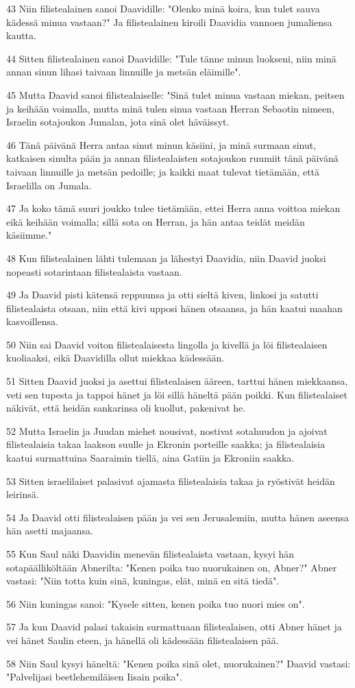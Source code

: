 \par 43 Niin filistealainen sanoi Daavidille: "Olenko minä koira, kun tulet sauva kädessä minua vastaan?" Ja filistealainen kiroili Daavidia vannoen jumaliensa kautta.
\par 44 Sitten filistealainen sanoi Daavidille: "Tule tänne minun luokseni, niin minä annan sinun lihasi taivaan linnuille ja metsän eläimille".
\par 45 Mutta Daavid sanoi filistealaiselle: "Sinä tulet minua vastaan miekan, peitsen ja keihään voimalla, mutta minä tulen sinua vastaan Herran Sebaotin nimeen, Israelin sotajoukon Jumalan, jota sinä olet häväissyt.
\par 46 Tänä päivänä Herra antaa sinut minun käsiini, ja minä surmaan sinut, katkaisen sinulta pään ja annan filistealaisten sotajoukon ruumiit tänä päivänä taivaan linnuille ja metsän pedoille; ja kaikki maat tulevat tietämään, että Israelilla on Jumala.
\par 47 Ja koko tämä suuri joukko tulee tietämään, ettei Herra anna voittoa miekan eikä keihään voimalla; sillä sota on Herran, ja hän antaa teidät meidän käsiimme."
\par 48 Kun filistealainen lähti tulemaan ja lähestyi Daavidia, niin Daavid juoksi nopeasti sotarintaan filistealaista vastaan.
\par 49 Ja Daavid pisti kätensä reppuunsa ja otti sieltä kiven, linkosi ja satutti filistealaista otsaan, niin että kivi upposi hänen otsaansa, ja hän kaatui maahan kasvoillensa.
\par 50 Niin sai Daavid voiton filistealaisesta lingolla ja kivellä ja löi filistealaisen kuoliaaksi, eikä Daavidilla ollut miekkaa kädessään.
\par 51 Sitten Daavid juoksi ja asettui filistealaisen ääreen, tarttui hänen miekkaansa, veti sen tupesta ja tappoi hänet ja löi sillä häneltä pään poikki. Kun filistealaiset näkivät, että heidän sankarinsa oli kuollut, pakenivat he.
\par 52 Mutta Israelin ja Juudan miehet nousivat, nostivat sotahuudon ja ajoivat filistealaisia takaa laakson suulle ja Ekronin porteille saakka; ja filistealaisia kaatui surmattuina Saaraimin tiellä, aina Gatiin ja Ekroniin saakka.
\par 53 Sitten israelilaiset palasivat ajamasta filistealaisia takaa ja ryöstivät heidän leirinsä.
\par 54 Ja Daavid otti filistealaisen pään ja vei sen Jerusalemiin, mutta hänen aseensa hän asetti majaansa.
\par 55 Kun Saul näki Daavidin menevän filistealaista vastaan, kysyi hän sotapäälliköltään Abnerilta: "Kenen poika tuo nuorukainen on, Abner?" Abner vastasi: "Niin totta kuin sinä, kuningas, elät, minä en sitä tiedä".
\par 56 Niin kuningas sanoi: "Kysele sitten, kenen poika tuo nuori mies on".
\par 57 Ja kun Daavid palasi takaisin surmattuaan filistealaisen, otti Abner hänet ja vei hänet Saulin eteen, ja hänellä oli kädessään filistealaisen pää.
\par 58 Niin Saul kysyi häneltä: "Kenen poika sinä olet, nuorukainen?" Daavid vastasi: "Palvelijasi beetlehemiläisen Iisain poika".

